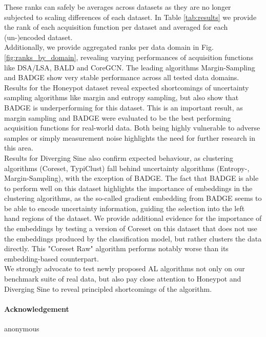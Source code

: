 \documentclass[]{article}
\begin{document}
These ranks can safely be averages across datasets as they are no longer subjected to scaling differences of each dataset.
In Table \ref{tab:results} we provide the rank of each acquisition function per dataset and averaged for each (un-)encoded dataset. \\
Additionally, we provide aggregated ranks per data domain in Fig. \ref{fig:ranks_by_domain}, revealing varying performances of acquisition functions like DSA/LSA, BALD and CoreGCN.
The leading algorithms Margin-Sampling and BADGE show very stable performance across all tested data domains. \\ [1mm]
Results for the Honeypot dataset reveal expected shortcomings of uncertainty sampling algorithms like margin and entropy sampling, but also show that BADGE is underperforming for this dataset. 
This is an important result, as margin sampling and BADGE were evaluated to be the best performing acquisition functions for real-world data.
Both being highly vulnerable to adverse samples or simply measurement noise highlights the need for further research in this area. \\
Results for Diverging Sine also confirm expected behaviour, as clustering algorithms (Coreset, TypiClust) fall behind uncertainty algorithms (Entropy-, Margin-Sampling), with the exception of BADGE.
The fact that BADGE is able to perform well on this dataset highlights the importance of embeddings in the clustering algorithms, as the so-called gradient embedding from BADGE seems to be able to encode uncertainty information, guiding the selection into the left hand regions of the dataset.
We provide additional evidence for the importance of the embeddings by testing a version of Coreset on this dataset that does not use the embeddings produced by the classification model, but rather clusters the data directly.
This "Coreset Raw" algorithm performs notably worse than its embedding-based counterpart. \\
We strongly advocate to test newly proposed AL algorithms not only on our benchmark suite of real data, but also pay close attention to Honeypot and Diverging Sine to reveal principled shortcomings of the algorithm.

\newpage
\paragraph{Acknowledgement}
anonymous
\end{document}
